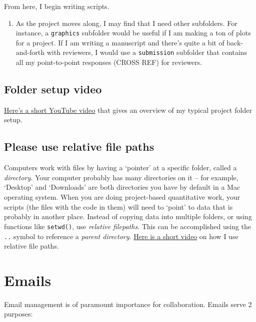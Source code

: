 \documentclass[
]{book}
\providecommand{\tightlist}{%
  \setlength{\itemsep}{0pt}\setlength{\parskip}{0pt}}
\begin{document}
From here, I begin writing scripts.

\begin{enumerate}
\def\labelenumi{\arabic{enumi}.}
\setcounter{enumi}{4}
\tightlist
\item
  As the project moves along, I may find that I need other subfolders. For instance, a \texttt{graphics} subfolder would be useful if I am making a ton of plots for a project. If I am writing a manuscript and there's quite a bit of back-and-forth with reviewers, I would use a \texttt{submission} subfolder that contains all my point-to-point responses (CROSS REF) for reviewers.
\end{enumerate}

\hypertarget{folder-video}{%
\subsection{Folder setup video}\label{folder-video}}

\href{https://youtu.be/4UxoLIOmkzc}{Here's a short YouTube video} that gives an overview of my typical project folder setup.

\hypertarget{please-use-relative-file-paths}{%
\subsection{Please use relative file paths}\label{please-use-relative-file-paths}}

Computers work with files by having a `pointer' at a specific folder, called a \emph{directory}. Your computer probably has many directories on it -- for example, `Desktop' and `Downloads' are both directories you have by default in a Mac operating system. When you are doing project-based quantitative work, your scripts (the files with the code in them) will need to `point' to data that is probably in another place. Instead of copying data into multiple folders, or using functions like \texttt{setwd()}, use \emph{relative filepaths}. This can be accomplished using the \texttt{..} symbol to reference a \emph{parent directory}. \href{https://youtu.be/eb11iggmuwM}{Here is a short video} on how I use relative file paths.

\hypertarget{emails}{%
\section{Emails}\label{emails}}

Email management is of paramount importance for collaboration. Emails serve 2 purposes:
\end{document}
